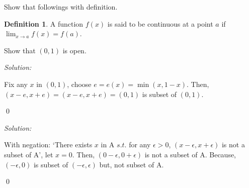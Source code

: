 \documentclass[12pt]{article}
\theoremstyle{definition}
\newtheorem{definition}{Definition}
\newenvironment{problem}[2][Problem]{\begin{trivlist}
\item[\hskip \labelsep {\bfseries #1}\hskip \labelsep {\bfseries #2.}]}{\end{trivlist}}
\newenvironment{sol}
{\emph{Solution:}
}
{
    \qed
    }
\begin{document}




Show that followings with definition.
\begin{definition}
    A function $f(x)$ is said to be continuous at a point $a$ if $\lim_{x\to a} f(x) = f(a)$.
\end{definition}
\begin{problem}{1} 
    Show that $(0,1)$ is open.
\end{problem}

\begin{sol}
    Fix any $x$ in $(0,1)$, choose $e = e(x) = \min(x, 1-x)$. Then, $(x-e, x+e) = (x-e, x+e) = (0, 1)$ is subset of $(0,1)$.
\end{sol}

\begin{problem}{2}
    
\end{problem}

\begin{sol}
    With negation: `There exists $x$ in A $s.t.$ for any $\epsilon > 0$, $(x-\epsilon, x+\epsilon)$ is not a subset of A',
    let $x = 0$. Then, $(0-\epsilon,0+\epsilon)$ is not a subset of A. Because, $(-\epsilon,0)$ is subset of $(-\epsilon,\epsilon)$ but, not subset of A.
\end{sol}






\end{document}
